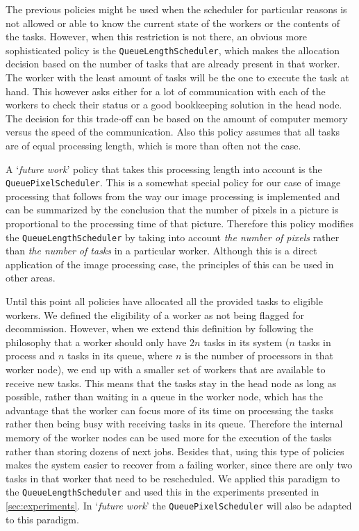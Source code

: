 \documentclass{stylesheet}
\begin{document}
The previous policies might be used when the scheduler for particular reasons is not allowed or able to know the current state of the workers or the contents of the tasks. However, when this restriction is not there, an obvious more sophisticated policy is the \texttt{QueueLengthScheduler}, which makes the allocation decision based on the number of tasks that are already present in that worker. The worker with the least amount of tasks will be the one to execute the task at hand. This however asks either for a lot of communication with each of the workers to check their status or a good bookkeeping solution in the head node. The decision for this trade-off can be based on the amount of computer memory versus the speed of the communication. Also this policy assumes that all tasks are of equal processing length, which is more than often not the case.

A `\textit{future work}' policy that takes this processing length into account is the \texttt{QueuePixelScheduler}. This is a somewhat special policy for our case of image processing that follows from the way our image processing is implemented and can be summarized by the conclusion that the number of pixels in a picture is proportional to the processing time of that picture. Therefore this policy modifies the \texttt{QueueLengthScheduler} by taking into account \textit{the number of pixels} rather than \textit{the number of tasks} in a particular worker. Although this is a direct application of the image processing case, the principles of this can be used in other areas.

Until this point all policies have allocated all the provided tasks to eligible workers. We defined the eligibility of a worker as not being flagged for decommission. However, when we extend this definition by following the philosophy that a worker should only have $2n$ tasks in its system ($n$ tasks in process and $n$ tasks in its queue, where $n$ is the number of processors in that worker node), we end up with a smaller set of workers that are available to receive new tasks. This means that the tasks stay in the head node as long as possible, rather than waiting in a queue in the worker node, which has the advantage that the worker can focus more of its time on processing the tasks rather then being busy with receiving tasks in its queue. Therefore the internal memory of the worker nodes can be used more for the execution of the tasks rather than storing dozens of next jobs. Besides that, using this type of policies makes the system easier to recover from a failing worker, since there are only two tasks in that worker that need to be rescheduled. We applied this paradigm to the \texttt{QueueLengthScheduler} and used this in the experiments presented in \cref{sec:experiments}. In `\textit{future work}' the \texttt{QueuePixelScheduler} will also be adapted to this paradigm.
\end{document}
